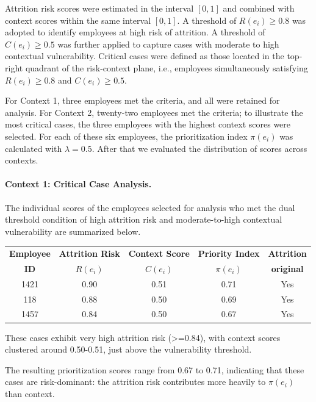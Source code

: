 \documentclass[runningheads]{llncs}
\begin{document}
Attrition risk scores were estimated in the interval $[0,1]$ and combined with context scores within the same interval $[0,1]$. A threshold of $R(e_i) \geq 0.8$ was adopted to identify employees at high risk of attrition. A threshold of $C(e_i) \geq 0.5$ was further applied to capture cases with moderate to high contextual vulnerability. Critical cases were defined as those located in the top-right quadrant of the risk-context plane, i.e., employees simultaneously satisfying $R(e_i) \geq 0.8$ and $C(e_i) \geq 0.5$.

For Context 1, three employees met the criteria, and all were retained for analysis. For Context 2, twenty-two employees met the criteria; to illustrate the most critical cases, the three employees with the highest context scores were selected. For each of these six employees, the prioritization index $\pi(e_i)$ was calculated with $\lambda = 0.5$. After that we evaluated the distribution of scores across contexts.

\paragraph{Context 1: Critical Case Analysis.}
The individual scores of the employees selected for analysis who met the dual threshold condition of high attrition risk and moderate-to-high contextual vulnerability are summarized below.
\begin{table}[h!]
\centering
\begin{tabular}{|c|c|c|c|c|}
\hline
\textbf{Employee} & \textbf{Attrition Risk} & \textbf{Context Score} & \textbf{Priority Index} & \textbf{Attrition} \\
\textbf{ID} & $R(e_i)$ & $C(e_i)$ & $\pi(e_i)$ &  \textbf{original} \\
\hline
1421 & 0.90 & 0.51 & 0.71 & Yes \\
\hline
118  & 0.88 & 0.50 & 0.69 & Yes \\
\hline
1457 & 0.84 & 0.50 & 0.67 & Yes \\
\hline
\end{tabular}
\end{table}
\vspace{-1.5em}

These cases exhibit very high attrition risk (>=0.84), with context scores clustered around 0.50-0.51, just above the vulnerability threshold.

The resulting prioritization scores range from 0.67 to 0.71, indicating that these cases are risk-dominant: the attrition risk contributes more heavily to $\pi(e_i)$ than context.
\end{document}
